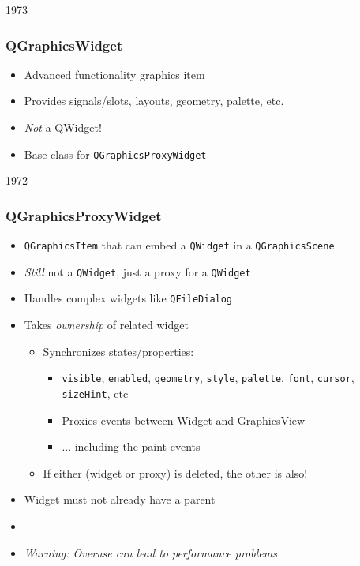 \begin{slide}{1973}
\frametitle{QGraphicsWidget}
\begin{itemize}
\item Advanced functionality graphics item
\item Provides signals/slots, layouts, geometry, palette, etc.
\item \textit{Not} a QWidget!
\item Base class for \texttt{QGraphicsProxyWidget}
\end{itemize}
\end{slide}


\begin{slide}{1972}
\frametitle{QGraphicsProxyWidget}
\begin{itemize}
\item \texttt{QGraphicsItem} that can embed a \texttt{QWidget} in a \texttt{QGraphicsScene}
\item \textit{Still} not a \texttt{QWidget}, just a proxy for a \texttt{QWidget}
\item Handles complex widgets like \texttt{QFileDialog}
\item Takes \textit{ownership} of related widget
    \begin{itemize}
    \item Synchronizes states/properties:
        \begin{itemize}
        \item \texttt{visible}, \texttt{enabled}, \texttt{geometry}, \texttt{style}, \texttt{palette}, \texttt{font}, \texttt{cursor}, \texttt{sizeHint}, etc
        \item Proxies events between Widget and GraphicsView
        \item ... including the paint events
        \end{itemize}
    \item If either (widget or proxy) is deleted, the other is also!
    \end{itemize}
\item Widget must not already have a parent
\item []
\item \textit{Warning: Overuse can lead to performance problems}
\end{itemize}
\end{slide}


